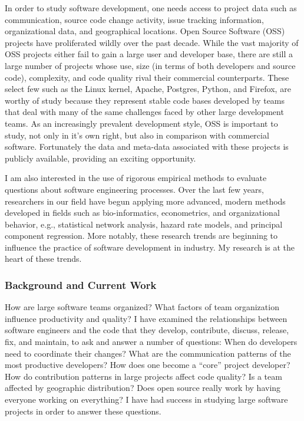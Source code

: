 \documentclass[10pt]{article}
\newcommand\Section[1]{\subsubsection*{\large #1}}
\begin{document}
\begin{small}
In order to study software development, one needs access to project data such
as communication, source code change activity, issue tracking information,
organizational data, and geographical locations.  Open Source Software (OSS)
projects have proliferated wildly over the past decade.  While the vast
majority of OSS projects either fail to gain a large user and developer base,
there are still a large number of projects whose use, size (in terms of both
developers and source code), complexity, and code quality rival their
commercial counterparts.  These select few such as the Linux kernel, Apache,
Postgres, Python, and Firefox, are worthy of study because they represent
stable code bases developed by teams that deal with many of the same challenges
faced by other large development teams.  As an increasingly prevalent
development style, OSS is important to study, not only in it's own right, but also
in comparison with commercial software.
Fortunately the data and meta-data associated with these projects is publicly
available, providing an exciting opportunity.

I am also interested in the use of rigorous empirical methods to evaluate
questions about software engineering processes.  Over the last few years,
researchers in our field have begun applying more advanced, modern methods
developed in fields such as bio-informatics, econometrics, and organizational
behavior, e.g., statistical network analysis, hazard rate models, and principal
component regression.  More notably, these research trends are beginning to
influence the practice of software development in industry.  My research is at
the heart of these trends.

\Section{Background and Current Work}

How are large software teams organized? What factors of team organization
influence productivity and quality?  I have examined the relationships between
software engineers and the code that they develop, contribute, discuss,
release, fix, and maintain, to ask and answer a number of questions: When do
developers need to coordinate their changes?  What are the communication
patterns of the most productive developers?  How does one become a ``core''
project developer?  How do contribution patterns in large projects affect code
quality? Is a team affected by geographic distribution? Does open source really
work by having everyone working on everything?  I have had success in studying
large software projects in order to answer these questions.


\end{small}
\end{document}
